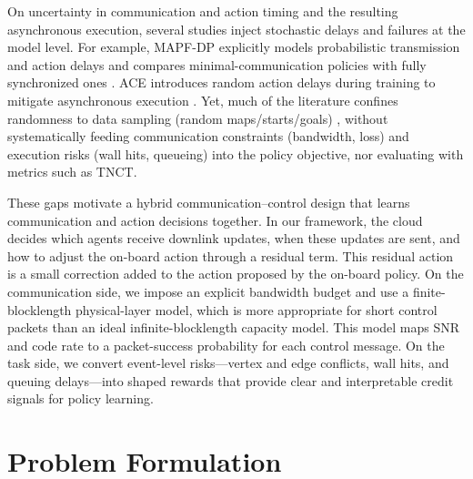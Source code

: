 \documentclass[conference]{IEEEtran}
\begin{document}
On uncertainty in communication and action timing and the resulting asynchronous execution, several studies inject stochastic delays and failures at the model level. For example, MAPF-DP explicitly models probabilistic transmission and action delays and compares minimal-communication policies with fully synchronized ones \cite{ma2017multi}.
ACE introduces random action delays during training to mitigate asynchronous execution \cite{yu2023asynchronous}. Yet, much of the literature confines randomness to data sampling (random maps/starts/goals) \cite{sartoretti2019primal,skrynnik2024learn,ma2021distributed,li2022multi,li2021lifelong}, without systematically feeding communication constraints (bandwidth, loss) and execution risks (wall hits, queueing) into the policy objective, nor evaluating with  metrics such as TNCT.

These gaps motivate a hybrid communication–control design that learns communication and action decisions together. In our framework, the cloud decides which agents receive downlink updates, when these updates are sent, and how to adjust the on-board action through a residual term. This residual action is a small correction added to the action proposed by the on-board policy. On the communication side, we impose an explicit bandwidth budget and use a finite-blocklength physical-layer model, which is more appropriate for short control packets than an ideal infinite-blocklength capacity model. This model maps SNR and code rate to a packet-success probability for each control message. On the task side, we convert event-level risks—vertex and edge conflicts, wall hits, and queuing delays—into shaped rewards that provide clear and interpretable credit signals for policy learning.



\section{Problem Formulation}
\end{document}
